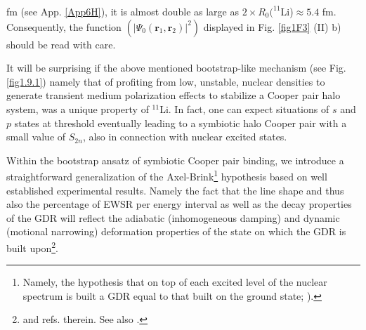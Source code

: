    fm (see App. \ref{App6H}), it is almost double as large as $2\times R_0(^{11}$Li)$\approx 5.4$ fm. Consequently, the function $(|\Psi_0(\mathbf r_1,\mathbf r_2)|^2)$ displayed  in Fig. \ref{fig1F3} (II) b) should be read with care.

It will be surprising if the above mentioned  bootstrap-like mechanism 
 (see Fig. \ref{fig1.9.1})  namely that of profiting from  low, unstable, nuclear densities to generate transient medium polarization effects to stabilize a Cooper pair halo system, was a unique property of $^{11}$Li. In fact, one can expect  situations of $s$ and $p$ states at threshold eventually leading to a symbiotic halo Cooper pair with a small value of $S_{2n}$, also in connection with  nuclear excited states. 





 
Within the bootstrap ansatz of symbiotic Cooper pair binding, we introduce a straightforward generalization of the Axel-Brink\footnote{Namely, the hypothesis that on top of each excited level of the nuclear spectrum is built a GDR equal to that built on the ground state; \cite{Axel:62,Brink:55}).} hypothesis based on  well established experimental    results. Namely the fact that the line shape and thus also the percentage of EWSR per energy interval as well as the decay properties of the GDR will reflect the  adiabatic (inhomogeneous damping) and dynamic (motional narrowing) deformation properties of the state on which the GDR is built upon\footnote{\cite{LeTourneaux:65,Bohr:75,Bortignon:98} and refs. therein. See also \cite{Dattagupta:87}.}.

